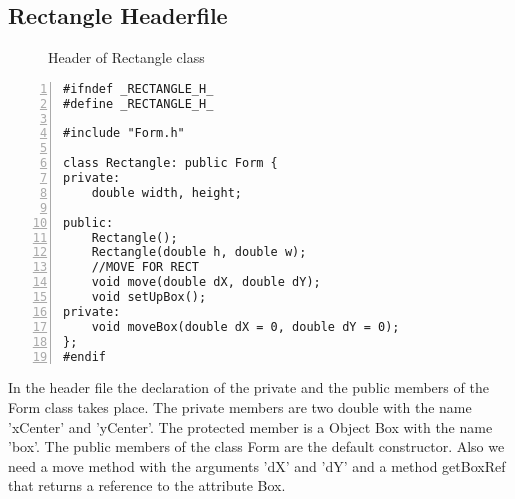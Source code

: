 \documentclass{article}
\begin{document}
\subsection{Rectangle Headerfile}
\begin{figure}
\scriptsize{\caption{Header of Rectangle class}}
\end{figure}
\begin{lstlisting}[basicstyle=\footnotesize\ttfamily, numbers=left, stepnumber=1, numberstyle = \normalsize]
#ifndef _RECTANGLE_H_
#define _RECTANGLE_H_

#include "Form.h"

class Rectangle: public Form {
private:
	double width, height; 

public:
	Rectangle();
	Rectangle(double h, double w);
	//MOVE FOR RECT
	void move(double dX, double dY);
	void setUpBox();
private:
	void moveBox(double dX = 0, double dY = 0);	
};
#endif
\end{lstlisting}
\normalsize{In the header file the declaration of the private and the public members of the Form class takes place.\newline
The private members are two double with the name 'xCenter' and 'yCenter'.
The protected member is a Object Box with the name 'box'.
The public members of the class Form are the default constructor.\newline 
Also we need a move method with the arguments 'dX' and 'dY' and a method getBoxRef that returns a reference to the attribute Box.\newline
}\newpage
\end{document}
